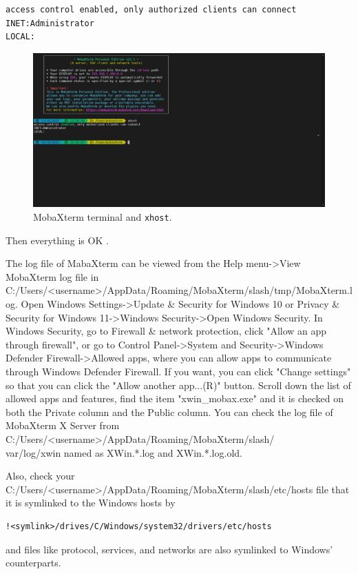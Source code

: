 \documentclass[a4paper,12pt,twoside]{article}
\begin{document}
\begin{verbatim}
access control enabled, only authorized clients can connect
INET:Administrator
LOCAL:
\end{verbatim}
\begin{figure}[H]
    \centering
    \includegraphics[width=\textwidth]{images/9.png}
    \caption{MobaXterm terminal and \texttt{xhost}.}
\end{figure}
Then everything is OK \cite{uppmax}.

The log file of MabaXterm can be viewed from the Help menu->View MobaXterm log file in C:/Users/<username>/AppData/Roaming/MobaXterm/slash/tmp/MobaXterm.log. Open Windows Settings->Update \& Security for Windows 10 or Privacy \& Security for Windows 11->Windows Security->Open Windows Security. In Windows Security, go to Firewall \& network protection, click "Allow an app through firewall", or go to Control Panel->System and Security->Windows Defender Firewall->Allowed apps, where you can allow apps to communicate through Windows Defender Firewall. If you want, you can click "Change settings" so that you can click the "Allow another app...(R)" button. Scroll down the list of allowed apps and features, find the item "xwin\_mobax.exe" and it is checked on both the Private column and the Public column. You can check the log file of MobaXterm X Server from C:/Users/<username>/AppData/Roaming/MobaXterm/slash/\\
var/log/xwin named as XWin.*.log and XWin.*.log.old.

Also, check your C:/Users/<username>/AppData/Roaming/MobaXterm/slash/etc/hosts file that it is symlinked to the Windows hosts by
\begin{verbatim}
!<symlink>/drives/C/Windows/system32/drivers/etc/hosts
\end{verbatim}
and files like protocol, services, and networks are also symlinked to Windows' counterparts.
\end{document}
